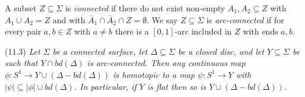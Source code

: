 A subset $Z \subseteq \Sigma$ is \textit{connected} if there do not exist non-empty $A_1, A_2 \subseteq Z$ with $A_1 \cup A_2 = Z$ and with $\bar{A}_1 \cap \bar{A}_2 \cap Z = \emptyset$. We say $Z \subseteq \Sigma$ is \textit{arc-connected} if for every pair $a, b \in Z$ with $a \ne b$ there is a $[0, 1]$-arc included in $Z$ with ends $a, b$.

\stmt
(11.3) \textit{Let $\Sigma$ be a connected surface, let $\Delta \subseteq \Sigma$ be a closed disc, and let $Y \subseteq \Sigma$ be such that $Y \cap bd(\Delta)$ is arc-connected. Then any continuous map $\phi \colon S^1 \to Y \cup (\Delta - bd(\Delta))$ is homotopic to a map $\psi \colon S^1 \to Y$ with $|\psi| \subseteq |\phi| \cup bd(\Delta)$. In particular, if $Y$ is flat then so is $Y \cup (\Delta - bd(\Delta))$.}

